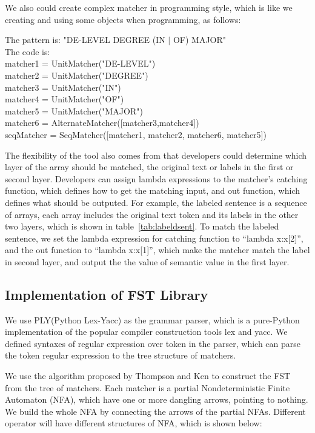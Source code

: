 We also could create complex matcher in programming style, which is like we creating and using some objects when programming, as follows:

\begin{framed}
\small
\noindent
The pattern is:  "DE-LEVEL DEGREE (IN $\vert$ OF) MAJOR" \\
The code is: \\
matcher1 = UnitMatcher("DE-LEVEL") \\
matcher2 = UnitMatcher("DEGREE")  \\
matcher3 = UnitMatcher("IN")   \\
matcher4 = UnitMatcher("OF")   \\
matcher5 = UnitMatcher("MAJOR")  \\
matcher6 = AlternateMatcher([matcher3,matcher4])   \\
seqMatcher = SeqMatcher([matcher1, matcher2, matcher6, matcher5])

\end{framed}

The flexibility of the tool also comes from that developers could determine which layer of the array should be matched, the original text or labels in the first or second layer. Developers can assign lambda expressions to the matcher's catching function, which defines how to get the matching input, and out function, which defines what should be outputed. For example,  the labeled sentence is a sequence of arrays, each array includes the original text token and its labels in the other two layers, which is shown in table~\ref{tab:labeldsent}. To match the labeled sentence, we set the lambda expression for catching function to ``lambda x:x[2]'', and the out function to ``lambda x:x[1]'', which make the matcher match the label in second layer, and output the the value of semantic value in the first layer.


\subsection{Implementation of FST Library}
We use PLY(Python Lex-Yacc) as the grammar parser, which is a pure-Python implementation of the popular compiler construction tools lex and yacc. We defined  syntaxes of regular expression over token in the parser, which can parse the token regular expression to the tree structure of matchers.

We use the algorithm proposed by Thompson and Ken\cite{thompson1968programming} to construct the FST from the tree of matchers. Each matcher is a partial Nondeterministic Finite Automaton (NFA), which have one or more dangling arrows, pointing to nothing. We build the whole NFA by connecting the arrows of the partial NFAs. Different operator will have different structures of NFA, which is shown below:

